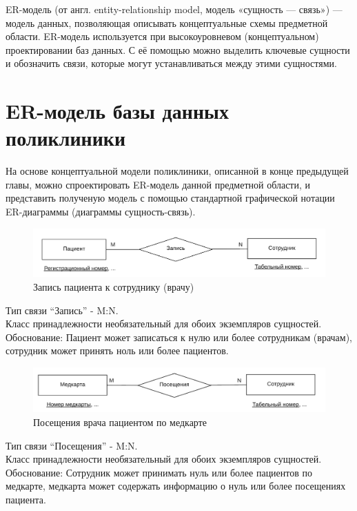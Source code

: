 \documentclass[14pt,a4paper,russian]{extreport}
\begin{document}
ER-модель (от англ. entity-relationship model, модель «сущность — связь») — модель данных,
позволяющая описывать концептуальные схемы предметной области.  ER-модель используется при
высокоуровневом (концептуальном) проектировании баз данных. С её помощью можно выделить ключевые
сущности и обозначить связи, которые могут устанавливаться между этими сущностями.\cite{dbdesign}


\vspace{0.7cm}
\section{ER-модель базы данных поликлиники}
На основе концептуальной модели поликлиники, описанной в конце предыдущей главы, можно
спроектировать ER-модель данной предметной области, и представить полученую модель с
помощью стандартной графической нотации ER-диаграммы (диаграммы сущность-связь).

\begin{figure}[h!]
        \includegraphics[width=\textwidth]{patappemp}
        \caption{Запись пациента к сотруднику (врачу)}
        \label{fig:patappemp}
\end{figure}

\noindent Тип связи ``Запись'' - M:N.\\
Класс принадлежности необязательный для обоих экземпляров сущностей.
Обоснование: Пациент может записаться к нулю или более сотрудникам (врачам), сотрудник может принять ноль или более
пациентов. 

\begin{figure}[h!]
        \includegraphics[width=\textwidth]{medcvisemp}
        \caption{Посещения врача пациентом по медкарте}
        \label{fig:medcvisemp}
\end{figure}

\noindent Тип связи ``Посещения'' - M:N.\\
Класс принадлежности необязательный для обоих экземпляров сущностей.
Обоснование: Сотрудник может принимать нуль или более пациентов по медкарте, медкарта может
содержать информацию о нуль или более посещениях пациента.
\end{document}
